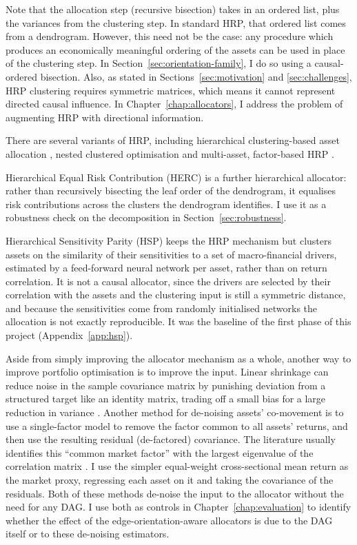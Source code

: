 \documentclass[11pt, a4paper]{report}
\begin{document}
Note that the allocation step (recursive bisection) takes in an ordered list, plus the variances from the clustering step. In standard HRP, that ordered list comes from a dendrogram. However, this need not be the case: any procedure which produces
an economically meaningful ordering of the assets can be used in place of the clustering step.
In Section~\ref{sec:orientation-family}, I do so using a causal-ordered bisection.
Also, as stated in Sections~\ref{sec:motivation} and \ref{sec:challenges}, HRP clustering requires symmetric matrices, which means
it cannot represent directed causal influence.
In Chapter~\ref{chap:allocators}, I address the problem of augmenting HRP with directional information.

There are several variants of HRP, including hierarchical
clustering-based asset allocation \cite{raffinot2017hierarchical}, nested clustered optimisation
\cite{lopezdeprado2020mlam} and multi-asset, factor-based HRP \cite{lohre2020hrp}.

Hierarchical Equal Risk Contribution (HERC) \cite{raffinot2018herc} is a further hierarchical allocator: rather than recursively bisecting the leaf order of the dendrogram, it equalises risk contributions across the clusters the dendrogram identifies. I use it as a robustness check on the decomposition in Section~\ref{sec:robustness}.

Hierarchical Sensitivity Parity (HSP) \cite{rodriguez2023hsp} keeps the HRP mechanism but clusters assets on the similarity of their sensitivities to a set of macro-financial drivers, estimated by a feed-forward neural network per asset, rather than on return correlation. It is not a causal allocator, since the drivers are selected by their correlation with the assets and the clustering input is still a symmetric distance, and because the sensitivities come from randomly initialised networks the allocation is not exactly reproducible. It was the baseline of the first phase of this project (Appendix~\ref{app:hsp}).

Aside from simply improving the allocator mechanism as a whole, another way to improve portfolio optimisation is to improve the input. Linear shrinkage can reduce noise in the sample covariance matrix by punishing deviation from a structured target like an identity matrix, trading off a small bias for a large reduction in variance \cite{ledoitwolf2004}.
Another method for de-noising assets' co-movement is to use a single-factor model \cite{sharpe1963simplified} to remove the factor common to all assets' returns, and then use the resulting residual (de-factored) covariance.
The literature usually identifies this ``common market factor'' with the largest eigenvalue of the correlation matrix \cite{laloux1999noise}. I use the simpler equal-weight cross-sectional mean return as the market proxy, regressing each asset on it and taking the covariance of the residuals.
Both of these methods de-noise the input to the allocator without the need for any DAG. 
I use both as controls in Chapter~\ref{chap:evaluation} to identify whether the effect of the edge-orientation-aware allocators is due to the DAG itself or to these de-noising estimators.
\end{document}
